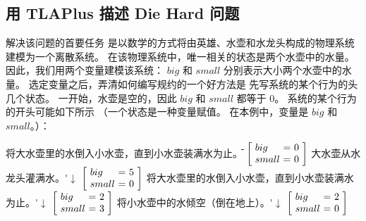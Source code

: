 \begin{ch}
  \subsection{用 TLAPlus 描述 Die Hard 问题}%

  解决该问题的首要任务
  是以数学的方式将由英雄、水壶和水龙头构成的物理系统建模为一个离散系统。
  在该物理系统中，唯一相关的状态是两个水壶中的水量。
  因此，我们用两个变量建模该系统：
  $big$ 和 $small$ 分别表示大小两个水壶中的水量。
  选定变量之后，弄清如何编写规约的一个好方法是
  先写系统的某个行为的头几个状态。
  一开始，水壶是空的，因此 $big$ 和 $small$ 都等于 0。
  系统的某个行为的开头可能如下所示
  （一个状态是一种变量赋值。
  在本例中，变量是 $big$ 和 $small$。）：
  \begin{display}
  \begin{tabbing}
  将大水壶里的水倒入小水壶，直到小水壶装满水为止。\= \kill
  \>
  $\dhstate{0}{0}$
  \>大水壶从水龙头灌满水。\'$\downarrow$
  \>
  $\dhstate{5}{0}$ 
  \>将大水壶里的水倒入小水壶，直到小水壶装满水为止。\'$\downarrow$
  \>
  $\dhstate{2}{3}$
  \>将小水壶中的水倾空（倒在地上）。\'$\downarrow$
  \> $\dhstate{2}{0}$
  \end{tabbing}
  \end{display}
\end{ch}
